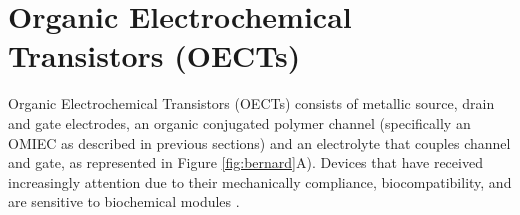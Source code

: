 

 


\section{Organic Electrochemical Transistors (OECTs)} \label{sec:OECTs}

Organic Electrochemical Transistors (OECTs) consists of metallic source, drain and gate electrodes, an organic conjugated polymer channel (specifically an OMIEC as described in previous sections) and an electrolyte that couples channel and gate, as represented in Figure \ref{fig:bernard}A). Devices that have received increasingly attention due to their mechanically compliance, biocompatibility, and are sensitive to biochemical modules \cite{tanMixedIonicElectronic2022}. 

